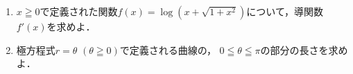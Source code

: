 \documentclass[../../main.tex]{subfiles}
\begin{document}
\begin{enumerate}
  \item $x \geqq 0$で定義された関数$f(x)=\log(x+\sqrt{1+x^2})$について，導関数$f'(x)$を求めよ．
  \item 極方程式$r=\theta$ $(\theta\geqq0)$で定義される曲線の，
    $0\leqq\theta\leqq\pi$の部分の長さを求めよ．
\end{enumerate}
\end{document}
